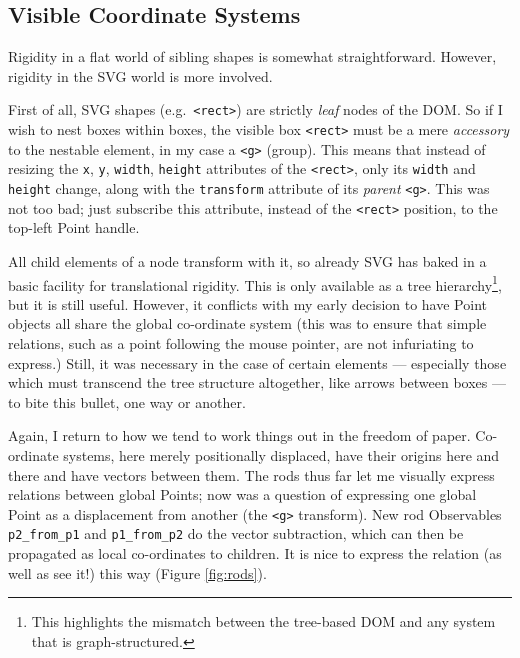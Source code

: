 \hypertarget{visible-coordinate-systems}{%
\subsection{Visible Coordinate
Systems}\label{visible-coordinate-systems}}

Rigidity in a flat world of sibling shapes is somewhat straightforward.
However, rigidity in the SVG world is more involved.

First of all, SVG shapes (e.g.~\texttt{\textless{}rect\textgreater{}})
are strictly \emph{leaf} nodes of the DOM. So if I wish to nest boxes
within boxes, the visible box \texttt{\textless{}rect\textgreater{}}
must be a mere \emph{accessory} to the nestable element, in my case a
\texttt{\textless{}g\textgreater{}} (group). This means that instead of
resizing the \texttt{x}, \texttt{y}, \texttt{width}, \texttt{height}
attributes of the \texttt{\textless{}rect\textgreater{}}, only its
\texttt{width} and \texttt{height} change, along with the
\texttt{transform} attribute of its \emph{parent}
\texttt{\textless{}g\textgreater{}}. This was not too bad; just
subscribe this attribute, instead of the
\texttt{\textless{}rect\textgreater{}} position, to the top-left Point
handle.

All child elements of a node transform with it, so already SVG has baked
in a basic facility for translational rigidity. This is only available
as a tree hierarchy\footnote{This highlights the mismatch between the
  tree-based DOM and any system that is graph-structured.}, but it is
still useful. However, it conflicts with my early decision to have Point
objects all share the global co-ordinate system (this was to ensure that
simple relations, such as a point following the mouse pointer, are not
infuriating to express.) Still, it was necessary in the case of certain
elements --- especially those which must transcend the tree structure
altogether, like arrows between boxes --- to bite this bullet, one way
or another.

Again, I return to how we tend to work things out in the freedom of
paper. Co-ordinate systems, here merely positionally displaced, have
their origins here and there and have vectors between them. The rods
thus far let me visually express relations between global Points; now
was a question of expressing one global Point as a displacement from
another (the \texttt{\textless{}g\textgreater{}} transform). New rod
Observables \texttt{p2\_from\_p1} and \texttt{p1\_from\_p2} do the
vector subtraction, which can then be propagated as local co-ordinates
to children. It is nice to express the relation (as well as see it!)
this way (Figure \ref{fig:rods}).

